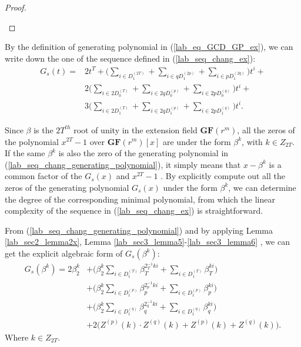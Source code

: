 \documentclass{mcom-l}
\theoremstyle{definition}
\numberwithin{equation}{section}
\begin{document}
\begin{proof}
\begin{enumerate}
            \end{enumerate}
            
            \end{proof}
                 
              
              
             
            By the definition of generating polynomial in (\ref{lab_eq_GCD_GP_ex}), we can  write down the one of the sequence defined in (\ref{lab_seq_chang_ex}):
            \begin{equation}\label{lab_seq_chang_generating_polynomial}
            \begin{split}
            G_{s}(t)=&2t^{T}+\bigl(\sum_{i\in D_{1}^{(2T)}}+\sum_{i\in qD_{1}^{(2p)}}+\sum_{i\in pD_{1}^{(2q)}}\bigr)t^{i}+\\
            &2\bigl(\sum_{i\in 2D_{0}^{(T)}}+\sum_{i\in 2qD_{0}^{(p)}}+\sum_{i\in 2pD_{0}^{(q)}}\bigr)t^{i}+\\
            &3\bigl(\sum_{i\in 2D_{1}^{(T)}}+\sum_{i\in 2qD_{1}^{(p)}}+\sum_{i\in 2pD_{1}^{(q)}}\bigr)t^{i}.
            \end{split}
            \end{equation}
            
            Since $ \beta $ is the $ 2T^{th} $ root of unity in the extension field $ \mathbf{GF}(r^{m}) $, all the zeros of the polynomial $ x^{2T}-1 $ over $ \mathbf{GF}(r^{m})[x]  $ are under the form $ \beta^{k} $, with $ k\in Z_{2T} $. If the same $ \beta^{k} $ is also the zero of the generating polynomial in (\ref{lab_seq_chang_generating_polynomial}), it simply means that $ x- \beta^{k} $ is a common factor of the $ G_{s}(x) $ and $ x^{2T}-1 $ . By explicitly compute out all the zeros of the generating polynomial $ G_{s}(x) $ under the form $ \beta^{k} $, we can determine the degree of the corresponding minimal polynomial, from which the linear complexity of the sequence in (\ref{lab_seq_chang_ex}) is straightforward.
            
            From (\ref{lab_seq_chang_generating_polynomial}) and by  applying Lemma \ref{lab_sec2_lemma2x}, Lemma \ref{lab_sec3_lemma5}-\ref{lab_sec3_lemma6} , we can get the explicit algebraic form of $ G_{s}(\beta^{k}) $:
            \begin{equation}\label{lab_seq_chang_GP_in_beta_k}
            \begin{split}
             G_{s}(\beta^{k})=2\beta_{2}^{k}&+\biggl(\beta_{2}^{k}\sum_{i\in D_{1}^{(T)}}\beta_{T}^{2_{T}^{-1}ki}+\sum_{i\in D_{1}^{(T)}}\beta_{T}^{ki}\biggr)\\
             &+\biggl(\beta_{2}^{k}\sum_{i\in D_{1}^{(p)}}\beta_{p}^{2_{p}^{-1}ki}+\sum_{i\in D_{1}^{(p)}}\beta_{p}^{ki}\biggr)\\
             &+\biggl(\beta_{2}^{k}\sum_{i\in D_{1}^{(q)}}\beta_{q}^{2_{q}^{-1}ki}+\sum_{i\in D_{1}^{(q)}}\beta_{q}^{ki}\biggr)\\
             &+2\biggl(Z^{(p)}(k)\cdot Z^{(q)}(k)+Z^{(p)}(k)+Z^{(q)}(k)\biggr).
            \end{split}
            \end{equation}
            Where $ k\in Z_{2T} $.
            
\end{document}
